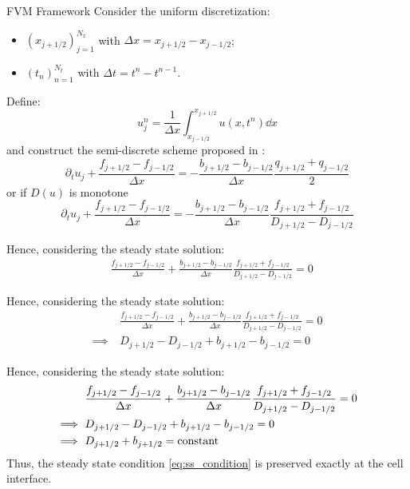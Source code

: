 \documentclass[
    pdf,
    11pt,
    xcolor={svgnames},
  ]{beamer}
\begin{document}
\begin{frame}{FVM Framework}
    Consider the uniform discretization:
    \begin{itemize}
        \item $(x_{j+1/2})_{j=1}^{N_x}$ with $\Delta x = x_{j+1/2}-x_{j-1/2}$;
        \item $(t_n)_{n=1}^{N_t}$ with $\Delta t = t^n - t^{n-1}$.
    \end{itemize}
    \pause
    Define:
    \begin{equation*}
        u_j^n = \frac{1}{\Delta x} \int_{x_{j-1/2}}^{x_{j+1/2}} u(x,t^n) \dd{x}
    \end{equation*}
    \pause
    and construct the semi-discrete scheme proposed in \cite{Jin2001}:
    \begin{equation}
        \partial_t u_j + \frac{f_{j+1/2} - f_{j-1/2}}{\Delta x} = - \frac{b_{j+1/2} - b_{j-1/2}}{\Delta x} \frac{q_{j+1/2} + q_{j-1/2}}{2}
    \end{equation}
    \pause
    or if $D(u)$ is monotone
    \begin{equation} \label{eq:deterministic_scheme}
        \partial_t u_j + \frac{f_{j+1/2} - f_{j-1/2}}{\Delta x} = - \frac{b_{j+1/2} - b_{j-1/2}}{\Delta x} \frac{f_{j+1/2} + f_{j-1/2}}{D_{j+1/2}-D_{j-1/2}}
    \end{equation}
\end{frame}

\begin{frame}
    Hence, considering the steady state solution:
    \begin{align*}
        & 
        \frac{f_{j+1/2} - f_{j-1/2}}{\Delta x} + \frac{b_{j+1/2} - b_{j-1/2}}{\Delta x} \frac{f_{j+1/2} + f_{j-1/2}}{D_{j+1/2}-D_{j-1/2}} = 0
    \end{align*}
\end{frame}
\begin{frame}
    Hence, considering the steady state solution:
    \begin{align*}
        & 
        \frac{f_{j+1/2} - f_{j-1/2}}{\Delta x} + \frac{b_{j+1/2} - b_{j-1/2}}{\Delta x} \frac{f_{j+1/2} + f_{j-1/2}}{D_{j+1/2}-D_{j-1/2}} = 0 \\
        \implies\ 
        &
        D_{j+1/2} - D_{j-1/2} + b_{j+1/2} - b_{j-1/2} = 0
    \end{align*}
\end{frame}
\begin{frame}
    Hence, considering the steady state solution:
    \begin{align*}
        & 
        \frac{f_{j+1/2} - f_{j-1/2}}{\Delta x} + \frac{b_{j+1/2} - b_{j-1/2}}{\Delta x} \frac{f_{j+1/2} + f_{j-1/2}}{D_{j+1/2}-D_{j-1/2}} = 0 \\
        \implies\ 
        &
        D_{j+1/2} - D_{j-1/2} + b_{j+1/2} - b_{j-1/2} = 0 \\
        \implies\ 
        &
        D_{j+1/2} + b_{j+1/2} = {\rm constant}
    \end{align*}
    Thus, the steady state condition \eqref{eq:ss_condition} is preserved exactly at the cell interface.
\end{frame}
\end{document}
